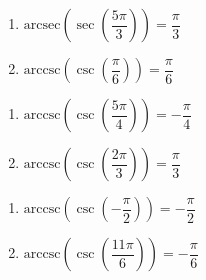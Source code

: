 \documentclass{ximera}
\begin{document}
\begin{multicols}{2}

\begin{enumerate}

\setcounter{enumi}{\value{HW}}

\item  $\text{arcsec}\left(\sec\left(\dfrac{5\pi}{3}\right) \right) = \dfrac{\pi}{3}$
\item  $\text{arccsc}\left(\csc\left(\dfrac{\pi}{6}\right) \right) = \dfrac{\pi}{6}$ 

\setcounter{HW}{\value{enumi}}

\end{enumerate}

\end{multicols}

\begin{multicols}{2}

\begin{enumerate}

\setcounter{enumi}{\value{HW}}

\item  $\text{arccsc}\left(\csc\left(\dfrac{5\pi}{4}\right) \right) = -\dfrac{\pi}{4}$
\item  $\text{arccsc}\left(\csc\left( \dfrac{2\pi}{3} \right) \right) = \dfrac{\pi}{3}$

\setcounter{HW}{\value{enumi}}

\end{enumerate}

\end{multicols}

\begin{multicols}{2}

\begin{enumerate}

\setcounter{enumi}{\value{HW}}

\item  $\text{arccsc}\left(\csc\left(-\dfrac{\pi}{2} \right) \right) = -\dfrac{\pi}{2}$ 
\item  $\text{arccsc}\left(\csc\left(\dfrac{11\pi}{6}\right) \right) = -\dfrac{\pi}{6}$

\setcounter{HW}{\value{enumi}}

\end{enumerate}

\end{multicols}
\end{document}
